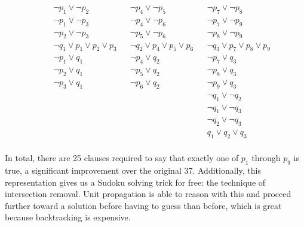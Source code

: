 \documentclass{article}
\begin{document}
\begin{align*}
  && \lnot p_1 \lor \lnot p_2
  && \lnot p_4 \lor \lnot p_5
  && \lnot p_7 \lor \lnot p_8 \\
  && \lnot p_1 \lor \lnot p_3
  && \lnot p_4 \lor \lnot p_6
  && \lnot p_7 \lor \lnot p_9 \\
  && \lnot p_2 \lor \lnot p_3
  && \lnot p_5 \lor \lnot p_6
  && \lnot p_8 \lor \lnot p_9 \\
  && \lnot q_1 \lor p_1 \lor p_2 \lor p_3
  && \lnot q_2 \lor p_4 \lor p_5 \lor p_6
  && \lnot q_3 \lor p_7 \lor p_8 \lor p_9 \\
  && \lnot p_1 \lor q_1
  && \lnot p_4 \lor q_2
  && \lnot p_7 \lor q_3 \\
  && \lnot p_2 \lor q_1
  && \lnot p_5 \lor q_2
  && \lnot p_8 \lor q_3 \\
  && \lnot p_3 \lor q_1
  && \lnot p_6 \lor q_2
  && \lnot p_9 \lor q_3 \\
  && && && \lnot q_1 \lor \lnot q_2 \\
  && && && \lnot q_1 \lor \lnot q_3 \\
  && && && \lnot q_2 \lor \lnot q_3 \\
  && && && q_1 \lor q_2 \lor q_3 \\
\end{align*}


In total, there are 25 clauses required
to say that exactly one of $p_1$ through $p_9$ is true,
a significant improvement over the original 37.
Additionally, this representation gives us a Sudoku solving trick for free:
the technique of intersection removal.
Unit propagation is able to reason with this
and proceed further toward a solution
before having to guess than before,
which is great because backtracking is expensive.
\end{document}
